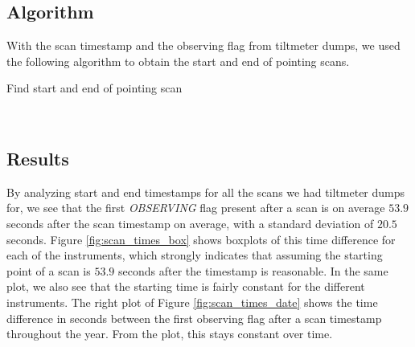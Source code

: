 \subsection{Algorithm}
With the scan timestamp and the observing flag from tiltmeter dumps, we used the following algorithm to obtain the start and end of pointing scans.

\begin{algorithm}[H]
    \caption{Find start and end of pointing scan}
    \label{alg:scan_times}
    \begin{algorithmic}
            \Else
            \EndIf
        \EndFor
        \\
                \EndIf
                \EndIf
            \EndFor
        \EndFor
    \end{algorithmic}
\end{algorithm} 


\subsection{Results}
By analyzing start and end timestamps for all the scans we had tiltmeter dumps for,
we see that the first \textit{OBSERVING} flag present after a scan is on average $53.9$ seconds after the scan timestamp on average, with a standard deviation of $20.5$ seconds.
Figure \ref{fig:scan_times_box} shows boxplots of this time difference for each of the instruments, which strongly indicates that assuming the starting point of a scan is $53.9$ seconds after
the timestamp is reasonable.
In the same plot, we also see that the starting time is fairly constant for the different instruments.
The right plot of Figure \ref{fig:scan_times_date} shows the time difference in seconds between the first observing flag after a scan timestamp throughout the year.
From the plot, this stays constant over time.\\

